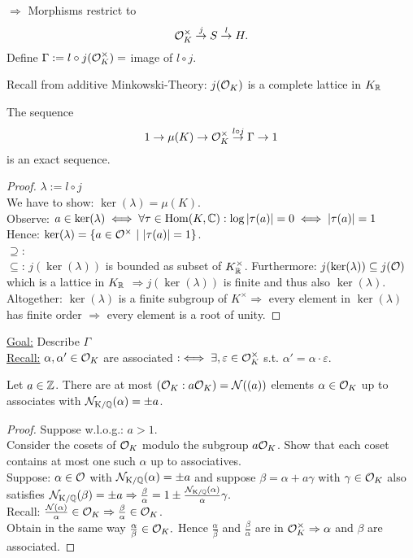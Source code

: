
$\Rightarrow$ Morphisms restrict to
\[ \mathcal{O}_K^\times \stackrel{j}{\to} S \stackrel{l}{\to} H.\]
Define $\Gamma:= l \circ j (\mathcal{O}_K^\times) =$ image of $l \circ j$.

Recall from additive Minkowski-Theory: $j( \mathcal{O}_K)$ is a complete lattice in $K_{\mathbb{R}}$

\begin{Prop}
The sequence
\[1 \to \mu(K) \to \mathcal{O}_K^\times \stackrel{l \circ j}{\to} \Gamma \to 1\]
is an exact sequence.
\end{Prop}

\begin{proof}
$\lambda:= l \circ j$\\
We have to show: $\ker(\lambda)=\mu(K)$.\\
Observe: $a \in \ker(\lambda) \iff \forall \tau \in \operatorname{Hom}(K, \mathbb{C}) : \log|\tau(a)|=0 \iff |\tau(a)|=1$\\
Hence: $\ker(\lambda) = \{a \in \mathcal{O}^\times \ | \ |\tau(a)|=1\}$.\\
\glqq $\supseteq$\grqq: \checkmark\\
\glqq $\subseteq$\grqq: $j(\ker(\lambda))$ is bounded as subset of $K_{\mathbb{R}}^\times$. Furthermore: $j(\ker(\lambda)) \subseteq j(\mathcal{O})$ which is a lattice in $K_{\mathbb{R}}$
$\Rightarrow j(\ker(\lambda))$ is finite and thus also $\ker(\lambda)$.\\
Altogether: $\ker(\lambda)$ is a finite subgroup of $K^\times \Rightarrow$ every element in $\ker(\lambda)$ has finite order $\Rightarrow$ every element is a root of unity.
\end{proof}

\underline{Goal:} Describe $\Gamma$\\
\underline{Recall:} $\alpha, \alpha' \in \mathcal{O}_K$ are associated $:\iff \exists, \varepsilon \in \mathcal{O}^\times_K$ s.t. $\alpha'=\alpha\cdot \varepsilon$.

\begin{Prop}
Let $a \in \mathbb{Z}$. There are at most $(\mathcal{O}_K: a\mathcal{O}_K) =\operatorname{\mathcal{N}}((a))$ elements $\alpha \in \mathcal{O}_K$ up to associates with $\operatorname{\mathcal{N}_{K/\mathbb{Q}}}(\alpha)=\pm a$.
\end{Prop}

\begin{proof}
Suppose w.l.o.g.: $a >1$.\\
Consider the cosets of $\mathcal{O}_K$ modulo the subgroup $a \mathcal{O}_K$. Show that each coset contains at most one such $\alpha$ up to associatives.\\
Suppose: $\alpha \in \mathcal{O}$ with $\operatorname{\mathcal{N}_{K/\mathbb{Q}}}(\alpha)=\pm a$ and suppose $\beta = \alpha + a \gamma$ with $\gamma \in \mathcal{O}_K$ also satisfies $\operatorname{\mathcal{N}_{K/\mathbb{Q}}}(\beta)=\pm a \Rightarrow \frac{\beta}{\alpha} = 1 \pm \frac{\operatorname{\mathcal{N}_{K/\mathbb{Q}}}(\alpha)}{\alpha} \gamma.$\\
Recall: $\frac{\operatorname{\mathcal{N}}(\alpha)}{\alpha} \in \mathcal{O}_K \Rightarrow \frac{\beta}{\alpha} \in \mathcal{O}_K$.\\
Obtain in the same way $\frac{\alpha}{\beta} \in \mathcal{O}_K.$ Hence $\frac{\alpha}{\beta}$ and $\frac{\beta}{\alpha}$ are in $\mathcal{O}_K^\times \Rightarrow \alpha$ and $\beta$ are associated.
\end{proof}

